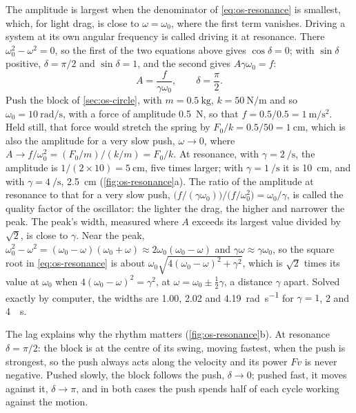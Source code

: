 The amplitude is largest when the denominator of \cref{eq:os-resonance} is
smallest, which, for light drag, is close to $\omega = \omega_0$, where the
first term vanishes. Driving a system at its own angular frequency is
called driving it at resonance. There $\omega_0^2 - \omega^2 = 0$, so the
first of the two equations above gives $\cos\delta = 0$; with $\sin\delta$
positive, $\delta = \pi/2$ and $\sin\delta = 1$, and the second gives
$A\gamma\omega_0 = f$:
\begin{equation*}
   A = \frac{f}{\gamma\omega_0} , \qquad \delta = \frac{\pi}{2} .
\end{equation*}
Push the block of \cref{sec:os-circle}, with $m = \SI{0.5}{\kilogram}$,
$k = \SI{50}{\newton\per\metre}$ and so $\omega_0 =
\SI{10}{\radian\per\second}$, with a force of amplitude
\SI{0.5}{\newton}, so that $f = 0.5/0.5 = \SI{1}{\metre\per\second
\squared}$. Held still, that force would stretch the spring by $F_0/k =
0.5/50 = \SI{1}{\centi\metre}$, which is also the amplitude for a very slow
push, $\omega \to 0$, where $A \to f/\omega_0^2 = (F_0/m)/(k/m) =
F_0/k$. At resonance, with
$\gamma = \SI{2}{\per\second}$, the amplitude is $1/(2\times10) =
\SI{5}{\centi\metre}$, five times larger; with $\gamma =
\SI{1}{\per\second}$ it is \SI{10}{\centi\metre}, and with $\gamma =
\SI{4}{\per\second}$, \SI{2.5}{\centi\metre} (\cref{fig:os-resonance}a).
The ratio of the amplitude at resonance to that for a very slow push,
$\bigl(f/(\gamma\omega_0)\bigr)\big/\bigl(f/\omega_0^2\bigr) =
\omega_0/\gamma$, is called the quality factor of the oscillator: the
lighter the drag, the higher and narrower the peak. The peak's width,
measured where $A$ exceeds its largest value divided by $\sqrt2$, is close
to $\gamma$. Near the peak, $\omega_0^2 - \omega^2 = (\omega_0 -
\omega)(\omega_0 + \omega) \approx 2\omega_0(\omega_0 - \omega)$ and
$\gamma\omega \approx \gamma\omega_0$, so the square root in
\cref{eq:os-resonance} is about $\omega_0\sqrt{4(\omega_0 - \omega)^2 +
\gamma^2}$, which is $\sqrt2$ times its value at $\omega_0$ when
$4(\omega_0 - \omega)^2 = \gamma^2$, at $\omega = \omega_0 \pm
\frac12\gamma$, a distance $\gamma$ apart. Solved exactly by computer, the
widths are 1.00, 2.02 and \SI{4.19}{\radian\per\second} for $\gamma = 1$,
2 and \SI{4}{\per\second}.

The lag explains why the rhythm matters (\cref{fig:os-resonance}b). At
resonance $\delta = \pi/2$: the block is at the centre of its swing,
moving fastest, when the push is strongest, so the push always acts along
the velocity and its power $F v$ is never negative. Pushed slowly, the
block follows the push, $\delta \to 0$; pushed fast, it moves against it,
$\delta \to \pi$, and in both cases the push spends half of each cycle
working against the motion.


